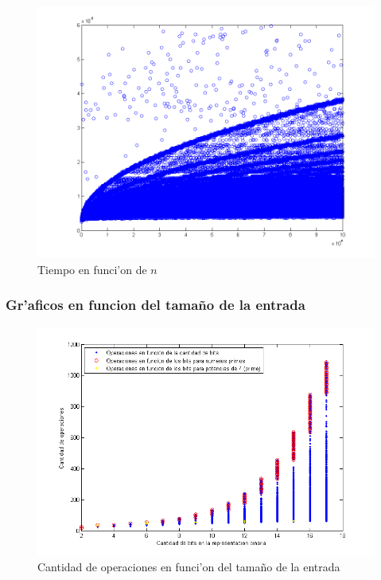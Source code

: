 \begin{figure}[H]
\centering
\includegraphics[scale=0.7]{../../codigo/ejercicio1/benchmark_de_tiempo/graficos/todos_los_numeros/todosLosNumerosPuntosTiempo.png}
\caption{Tiempo en funci'on de $n$}
\label{Ej1fig4}
\end{figure}

\subsubsection{Gr'aficos en funcion del tama\~{n}o de la entrada}
\begin{figure}[H]
\centering
\includegraphics[scale=0.6]{../../codigo/ejercicio1/benchmark/graficos/tamanio_Entrada_T/operacionesEntrada.png}
\caption{Cantidad de operaciones en funci'on del tama\~{n}o de la entrada}
\label{Ej1fig5}
\end{figure}


